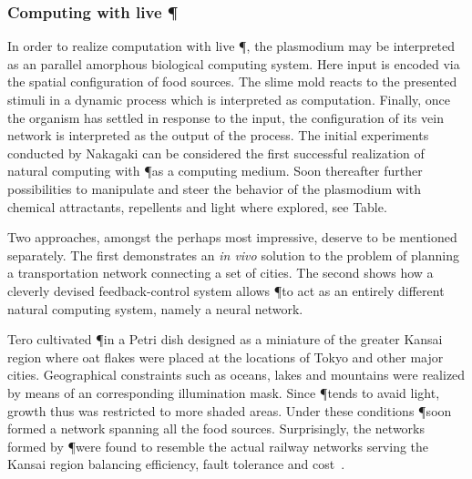 
		\subsubsection{Computing with live \P}

			In order to realize computation with live \P, the plasmodium may be interpreted as an parallel amorphous biological computing system. Here input is encoded via the spatial configuration of food sources. The slime mold reacts to the presented stimuli in a dynamic process which is interpreted as computation. Finally, once the organism has settled in response to the input, the configuration of its vein network is interpreted as the output of the process. The initial experiments conducted by Nakagaki \etal can be considered the first successful realization of natural computing with \P as a computing medium. Soon thereafter further possibilities to manipulate and steer the behavior of the plasmodium with chemical attractants, repellents and light where explored, see Table.  

			Two approaches, amongst the perhaps most impressive, deserve to be mentioned separately. The first demonstrates an \textit{in vivo} solution to the problem of planning a transportation network connecting a set of cities. The second shows how a cleverly devised feedback-control system allows \P to act as an entirely different natural computing system, namely a neural network.

			Tero \etal cultivated \P in a Petri dish designed as a miniature of the greater Kansai region where oat flakes were placed at the locations of Tokyo and other major cities. Geographical constraints such as oceans, lakes and mountains were realized by means of an corresponding illumination mask. Since \P tends to avaid light, growth thus was restricted to more shaded areas. Under these conditions \P soon formed a network spanning all the food sources. Surprisingly, the networks formed by \P were found to resemble the actual railway networks serving the Kansai region balancing efficiency, fault tolerance and cost~\cite{Tero439}. 

